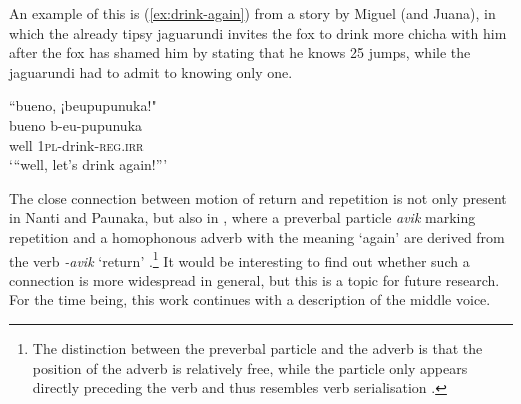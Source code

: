 



An example of this is (\ref{ex:drink-again}) from a story by Miguel (and Juana), in which the already tipsy jaguarundi invites the fox to drink more chicha with him after the fox has shamed him by stating that he knows 25 jumps, while the jaguarundi had to admit to knowing only one.

\ea\label{ex:drink-again}
\begingl 
\glpreamble “bueno, ¡beupupunuka!"\\
\gla bueno b-eu-pupunuka\\ 
\glb well 1\textsc{pl}-drink-\textsc{reg.irr}\\ 
\glft ‘“well, let’s drink again!”’\\ 
\endgl
\trailingcitation{[jmx-n120429ls-x5.371]}
\xe

The close connection between motion of return and repetition is not only present in Nanti and Paunaka, but also in , where a preverbal particle \textit{avik} marking repetition and a homophonous adverb with the meaning ‘again’ are derived from the verb \textit{-avik} ‘return’ \citep[283]{Danielsen2007}.\footnote{The distinction between the preverbal particle and the adverb is that the position of the adverb is relatively free, while the particle only appears directly preceding the verb and thus resembles verb serialisation \citep[283]{Danielsen2007}.} It would be interesting to find out whether such a connection is more widespread in general, but this is a topic for future research. For the time being, this work continues with a description of the middle voice.

